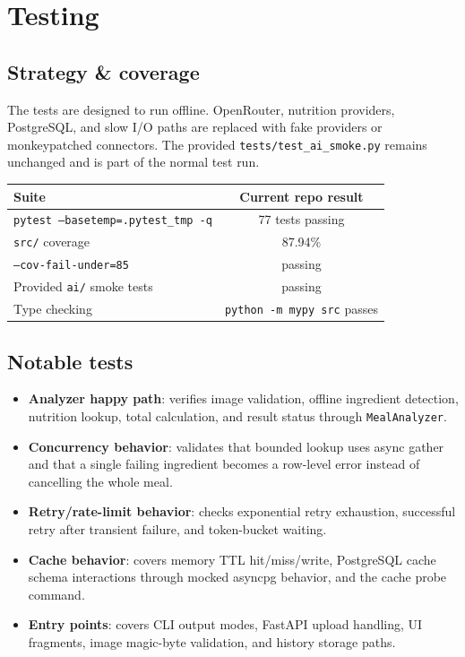 \documentclass[11pt,a4paper]{article}
\begin{document}
\section{Testing}\label{sec:testing}

\subsection{Strategy \& coverage}
The tests are designed to run offline. OpenRouter, nutrition providers, PostgreSQL, and slow I/O paths are replaced with fake providers or monkeypatched connectors. The provided \texttt{tests/test\_ai\_smoke.py} remains unchanged and is part of the normal test run.

\begin{center}\small
\begin{tabular}{lc}
\toprule
\textbf{Suite} & \textbf{Current repo result} \\
\midrule
\texttt{pytest --basetemp=.pytest\_tmp -q} & 77 tests passing \\
\texttt{src/} coverage & 87.94\% \\
\texttt{--cov-fail-under=85} & passing \\
Provided \texttt{ai/} smoke tests & passing \\
Type checking & \texttt{python -m mypy src} passes \\
\bottomrule
\end{tabular}
\end{center}

\subsection{Notable tests}
\begin{itemize}[itemsep=2pt]
  \item \textbf{Analyzer happy path}: verifies image validation, offline ingredient detection, nutrition lookup, total calculation, and result status through \texttt{MealAnalyzer}.
  \item \textbf{Concurrency behavior}: validates that bounded lookup uses async gather and that a single failing ingredient becomes a row-level error instead of cancelling the whole meal.
  \item \textbf{Retry/rate-limit behavior}: checks exponential retry exhaustion, successful retry after transient failure, and token-bucket waiting.
  \item \textbf{Cache behavior}: covers memory TTL hit/miss/write, PostgreSQL cache schema interactions through mocked asyncpg behavior, and the cache probe command.
  \item \textbf{Entry points}: covers CLI output modes, FastAPI upload handling, UI fragments, image magic-byte validation, and history storage paths.
\end{itemize}
\end{document}

